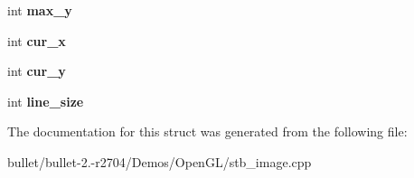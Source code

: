 \begin{DoxyCompactItemize}
\item 
\hypertarget{structstbi__gif__struct_aff3410e0fff097d4719e54096f6da69b}{int {\bfseries max\+\_\+y}}\label{structstbi__gif__struct_aff3410e0fff097d4719e54096f6da69b}

\item 
\hypertarget{structstbi__gif__struct_adbc7ae7e9ff2e2abdf66eb0e1a4b3ffb}{int {\bfseries cur\+\_\+x}}\label{structstbi__gif__struct_adbc7ae7e9ff2e2abdf66eb0e1a4b3ffb}

\item 
\hypertarget{structstbi__gif__struct_ac61865216c4b578c235f5b8170c2036c}{int {\bfseries cur\+\_\+y}}\label{structstbi__gif__struct_ac61865216c4b578c235f5b8170c2036c}

\item 
\hypertarget{structstbi__gif__struct_a5b7d7625c253025ff5ee4169afbf06b7}{int {\bfseries line\+\_\+size}}\label{structstbi__gif__struct_a5b7d7625c253025ff5ee4169afbf06b7}

\end{DoxyCompactItemize}


The documentation for this struct was generated from the following file\+:\begin{DoxyCompactItemize}
\item 
bullet/bullet-\/2.-\/r2704/\+Demos/\+Open\+G\+L/stb\+\_\+image.\+cpp\end{DoxyCompactItemize}
